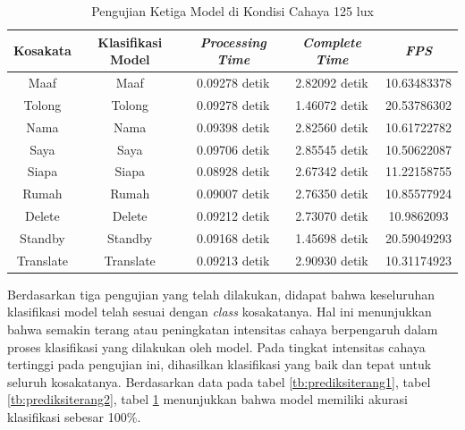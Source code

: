 \begin{longtable}{|c|c|c|c|c|}
  \caption{Pengujian Ketiga Model di Kondisi Cahaya 125 lux}
  \label{tb:prediksiterang3}                                   \\
  \hline
  \rowcolor[HTML]{C0C0C0}
  \textbf{Kosakata} & \textbf{Klasifikasi Model} & \textbf{\emph{Processing Time}} & \textbf{\emph{Complete Time}} & \textbf{\emph{FPS}}\\
  \hline
  Maaf              & Maaf                        & 0.09278 detik                           & 2.82092 detik                                 & 10.63483378\\
  Tolong            & Tolong                      & 0.09278 detik                           & 1.46072 detik                                 & 20.53786302\\
  Nama              & Nama                        & 0.09398 detik                           & 2.82560 detik                                 & 10.61722782\\
  Saya              & Saya                        & 0.09706 detik                           & 2.85545 detik                                 & 10.50622087\\
  Siapa             & Siapa                       & 0.08928 detik                           & 2.67342 detik                                 & 11.22158755\\
  Rumah             & Rumah                       & 0.09007 detik                           & 2.76350 detik                                 & 10.85577924\\
  Delete            & Delete                      & 0.09212 detik                           & 2.73070 detik                                 & 10.9862093\\
  Standby           & Standby                     & 0.09168 detik                           & 1.45698 detik                                 & 20.59049293\\
  Translate         & Translate                   & 0.09213 detik                           & 2.90930 detik                                 & 10.31174923\\
  \hline
\end{longtable}



Berdasarkan tiga pengujian yang telah dilakukan, didapat bahwa keseluruhan klasifikasi model telah sesuai dengan \emph{class} kosakatanya. Hal ini menunjukkan bahwa semakin terang atau peningkatan intensitas cahaya berpengaruh dalam proses klasifikasi yang dilakukan oleh model. Pada tingkat intensitas cahaya tertinggi pada pengujian ini, dihasilkan klasifikasi yang baik dan tepat untuk seluruh kosakatanya. Berdasarkan data pada tabel \ref{tb:prediksiterang1}, tabel \ref{tb:prediksiterang2}, tabel \ref{tb:prediksiterang3} menunjukkan bahwa model memiliki akurasi klasifikasi sebesar 100\%.

